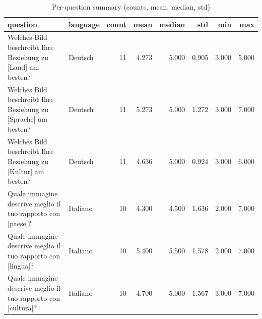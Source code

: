 \begin{table}[ht]
\centering
\begin{tabular}{llrrrrrr}
\toprule
question & language & count & mean & median & std & min & max \\
\midrule
Welches Bild beschreibt Ihre Beziehung zu [Land] am besten? & Deutsch & 11 & 4.273 & 5.000 & 0.905 & 3.000 & 5.000 \\
Welches Bild beschreibt Ihre Beziehung zu [Sprache] am besten? & Deutsch & 11 & 5.273 & 5.000 & 1.272 & 3.000 & 7.000 \\
Welches Bild beschreibt Ihre Beziehung zu [Kultur] am besten? & Deutsch & 11 & 4.636 & 5.000 & 0.924 & 3.000 & 6.000 \\
Quale immagine descrive meglio il tuo rapporto con [paese]? & Italiano & 10 & 4.300 & 4.500 & 1.636 & 2.000 & 7.000 \\
Quale immagine descrive meglio il tuo rapporto con [lingua]? & Italiano & 10 & 5.400 & 5.500 & 1.578 & 2.000 & 7.000 \\
Quale immagine descrive meglio il tuo rapporto con [cultura]? & Italiano & 10 & 4.700 & 5.000 & 1.567 & 3.000 & 7.000 \\
\bottomrule
\end{tabular}
\caption{Per-question summary (counts, mean, median, std)}\n\label{tab:perq}\n\end{table}
